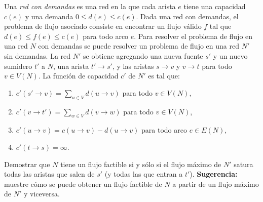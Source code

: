 

\item Una \emph{red con demandas} es una red en la que cada arista $e$ tiene una capacidad $c(e)$ y una demanda $0 \leq d(e) \leq c(e)$.  Dada una red con demandas, el problema de flujo asociado consiste en encontrar un flujo válido $f$ tal que $d(e) \leq f(e) \leq c(e)$ para todo arco $e$.  Para resolver el problema de flujo en una red $N$ con demandas se puede resolver un problema de flujo en una red $N'$ sin demandas.  La red $N'$ se obtiene agregando una nueva fuente $s'$ y un nuevo sumidero $t'$ a $N$, una arista $t' \to s'$, y las aristas $s \to v$ y $v \to t$ para todo $v \in V(N)$.  La función de capacidad $c'$ de $N'$ es tal que:
\begin{enumerate}[label=$\roman*$.,ref=$\roman*$] 
 \item $c'(s' \to v) = \sum_{u \in V} d(u \to v)$ para todo $v \in V(N)$,
 \item $c'(v \to t') = \sum_{w \in V} d(v \to w)$ para todo $v \in V(N)$,
 \item $c'(u \to v) = c(u \to v) - d(u \to v)$ para todo arco $e \in E(N)$,
 \item $c'(t \to s) = \infty$.
\end{enumerate}
Demostrar que $N$ tiene un flujo factible si y sólo si el flujo máximo de $N'$ satura todas las aristas que salen de $s'$ (y todas las que entran a $t'$).  \textbf{Sugerencia:} muestre cómo se puede obtener un flujo factible de $N$ a partir de un flujo máximo de $N'$ y viceversa.  


